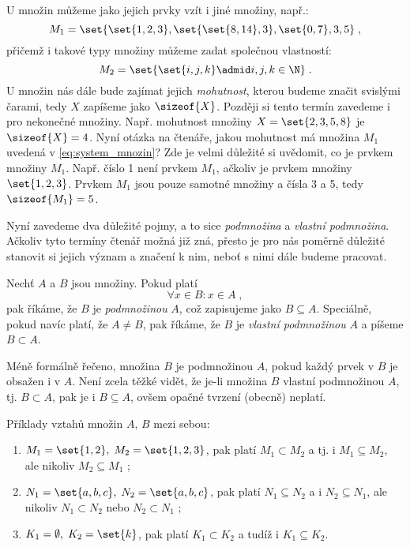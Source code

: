 U množin můžeme jako jejich prvky vzít i jiné množiny, např.:
\begin{equation}\label{eq:system_mnozin}
    M_1=\set{\set{1,2,3},\set{\set{8,14},3},\set{0,7}, 3, 5}\; ,
\end{equation}
přičemž i takové typy množiny můžeme zadat společnou vlastností:
\begin{equation*}
    M_2=\set{\set{i,j,k} \admid i,j,k\in\N}\; .
\end{equation*}
U množin nás dále bude zajímat jejich \emph{mohutnost}, kterou budeme značit svislými čarami, tedy $X$ zapíšeme jako $\sizeof{X}$. Později si tento termín zavedeme i pro nekonečné množiny. Např. mohutnost množiny $X=\set{2,3,5,8}$ je $\sizeof{X}=4$. Nyní otázka na čtenáře, jakou mohutnost má množina $M_1$ uvedená v \eqref{eq:system_mnozin}? Zde je velmi důležité si uvědomit, co je prvkem množiny $M_1$. Např. číslo 1 není prvkem $M_1$, ačkoliv je prvkem množiny $\set{1,2,3}$. Prvkem $M_1$ jsou pouze samotné množiny a čísla 3 a 5, tedy $\sizeof{M_1}=5$.\par
\medskip
Nyní zavedeme dva důležité pojmy, a to sice \emph{podmnožina} a \emph{vlastní podmnožina}. Ačkoliv tyto termíny čtenář možná již zná, přesto je pro nás poměrně důležité stanovit si jejich význam a značení k nim, neboť s nimi dále budeme pracovat.
\begin{definition}\label{def:podmnozina}
    Nechť $A$ a $B$ jsou množiny. Pokud platí
    \begin{equation*}
        \forall x\in B: x\in A\; ,
    \end{equation*}
    pak říkáme, že $B$ je \emph{podmnožinou} $A$, což zapisujeme jako $B \subseteq A$. Speciálně, pokud navíc platí, že $A \neq B$, pak říkáme, že $B$ je \emph{vlastní podmnožinou} $A$ a píšeme $B \subset A$.
\end{definition}
Méně formálně řečeno, množina $B$ je podmnožinou $A$, pokud každý prvek v $B$ je obsažen i v $A$. Není zcela těžké vidět, že je-li množina $B$ vlastní podmnožinou $A$, tj. $B \subset A$, pak je i $B \subseteq A$, ovšem opačné tvrzení (obecně) neplatí.
\begin{example}
    Příklady vztahů množin $A,\,B$ mezi sebou:
    \begin{enumerate}[label=(\roman*)]
        \item $M_1=\set{1,2},\; M_2=\set{1,2,3}$, pak platí $M_1 \subset M_2$ a tj. i $M_1 \subseteq M_2$, ale nikoliv $M_2 \subseteq M_1$ ;
        \item $N_1=\set{a,b,c},\; N_2=\set{a,b,c}$, pak platí $N_1 \subseteq N_2$ a i $N_2 \subseteq N_1$, ale nikoliv $N_1 \subset N_2$ nebo $N_2 \subset N_1$ ;
        \item $K_1=\emptyset,\; K_2=\set{k}$, pak platí $K_1 \subset K_2$ a tudíž i $K_1 \subseteq K_2$.
    \end{enumerate}
\end{example}
